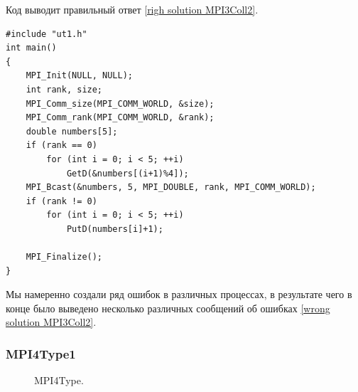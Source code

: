 Код выводит правильный ответ \ref{righ solution MPI3Coll2}.

\lstset{language=c++}
\begin{lstlisting}
#include "ut1.h"
int main()
{
	MPI_Init(NULL, NULL);
	int rank, size;
	MPI_Comm_size(MPI_COMM_WORLD, &size);
	MPI_Comm_rank(MPI_COMM_WORLD, &rank);
	double numbers[5];
	if (rank == 0)
		for (int i = 0; i < 5; ++i)
			GetD(&numbers[(i+1)%4]);
	MPI_Bcast(&numbers, 5, MPI_DOUBLE, rank, MPI_COMM_WORLD);
	if (rank != 0)
		for (int i = 0; i < 5; ++i)
			PutD(numbers[i]+1);

	MPI_Finalize();
}
\end{lstlisting}

Мы намеренно создали ряд ошибок в различных процессах, в результате чего в конце было выведено несколько различных сообщений об ошибках \ref{wrong solution MPI3Coll2}.

\newpage

\subsubsection{MPI4Type1}

\begin{figure}[htbp]%
    \centering
    \hfill%
    \caption{MPI4Type.}%
    \label{mpi4type}%
\end{figure}

